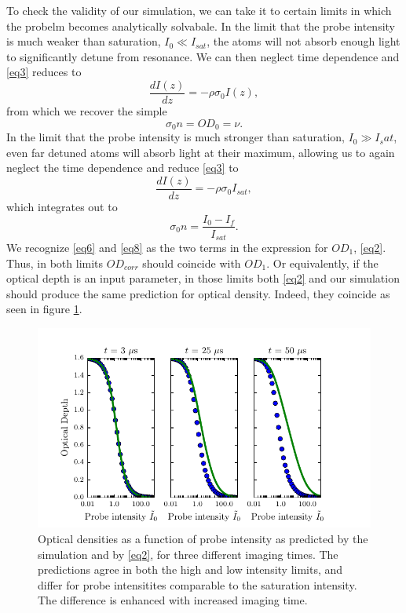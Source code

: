 \documentclass[12pt]{iopart}
\begin{document}
\par To check the validity of our simulation, we can take it to certain limits in which the probelm becomes analytically solvabale. In the limit that the probe intensity is much weaker than saturation, $I_0\ll I_{sat}$, the atoms will not absorb enough light to significantly detune from resonance. We can then neglect time dependence and \ref{eq3} reduces to 
\begin{equation}
\frac{dI(z)}{dz}=-\rho\sigma_0 I(z),
\end{equation}
from which we recover the simple
\begin{equation}
\sigma_0 n = OD_0 = \nu. \label{eq6}
\end{equation}
In the limit that the probe intensity is much stronger than saturation, $I_0\gg I_sat$, even far detuned atoms will absorb light at their maximum, allowing us to again neglect the time dependence and reduce \ref{eq3} to 
\begin{equation}
\frac{dI(z)}{dz}=-\rho\sigma_0 I_{sat}, 
\end{equation}
which integrates out to 
\begin{equation}
\sigma_0 n = \frac{I_0 - I_f}{I_{sat}}. \label{eq8}
\end{equation}
We recognize \ref{eq6} and \ref{eq8} as the two terms in the expression for $OD_1$, \ref{eq2}. Thus, in both limits $OD_{corr}$ should coincide with $OD_1$. Or equivalently, if the optical depth is an input parameter, in those limits both \ref{eq2} and our simulation should produce the same prediction for optical density. Indeed, they coincide as seen in figure \ref{fig:IsatLimits}.
\begin{figure}
	\includegraphics[scale=0.57]{figure3}
\caption{Optical densities as a function of probe intensity as predicted by the simulation and by \ref{eq2}, for three different imaging times. The predictions agree in both the high and low intensity limits, and differ for probe intensitites comparable to the saturation intensity. The difference is enhanced with increased imaging time.}  
\label{fig:IsatLimits}
\end{figure}
\end{document}
